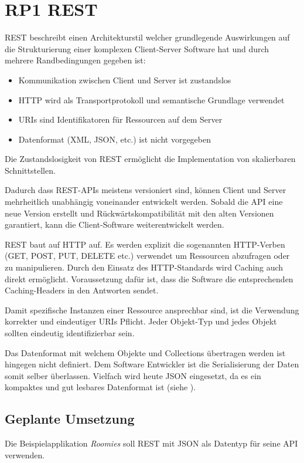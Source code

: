 \section{RP1 REST}
\label{sec:principle-rp1-rest}

\gls{REST} \cite{REST} beschreibt einen Architekturstil welcher grundlegende Auswirkungen auf die Strukturierung einer komplexen Client-Server Software hat und durch mehrere Randbedingungen gegeben ist:
\begin{itemize}
	\item Kommunikation zwischen Client und Server ist zustandslos
	\item HTTP wird als Transportprotokoll und semantische Grundlage verwendet
	\item \glspl{URI} sind Identifikatoren für Ressourcen auf dem Server
	\item Datenformat (XML, JSON, etc.) ist nicht vorgegeben
\end{itemize}

Die Zustandslosigkeit von REST ermöglicht die Implementation von skalierbaren Schnittstellen.

Dadurch dass REST-APIs meistens versioniert sind, können Client und Server mehrheitlich unabhängig voneinander entwickelt werden.
Sobald die API eine neue Version erstellt und Rückwärtskompatibilität mit den alten Versionen garantiert, kann die Client-Software weiterentwickelt werden.

REST baut auf HTTP auf. Es werden explizit die sogenannten HTTP-Verben (GET, POST, PUT, DELETE etc.) verwendet um Ressourcen abzufragen oder zu manipulieren.
Durch den Einsatz des HTTP-Standards wird Caching auch direkt ermöglicht. Voraussetzung dafür ist, dass die Software die entsprechenden Caching-Headers in den Antworten sendet.

Damit spezifische Instanzen einer Ressource ansprechbar sind, ist die Verwendung korrekter und eindeutiger \glspl{URI} Pflicht. Jeder Objekt-Typ und jedes Objekt sollten eindeutig identifizierbar sein.

Das Datenformat mit welchem Objekte und Collections übertragen werden ist hingegen nicht definiert. Dem Software Entwickler ist die Serialisierung der Daten somit selber überlassen.
Vielfach wird heute \gls{JSON} eingesetzt, da es ein kompaktes und gut lesbares Datenformat ist (siehe \cite{ProgrammableWebByeXML}).

\subsection*{Geplante Umsetzung}
Die Beispielapplikation \emph{Roomies} soll REST mit JSON als Datentyp für seine API verwenden.


